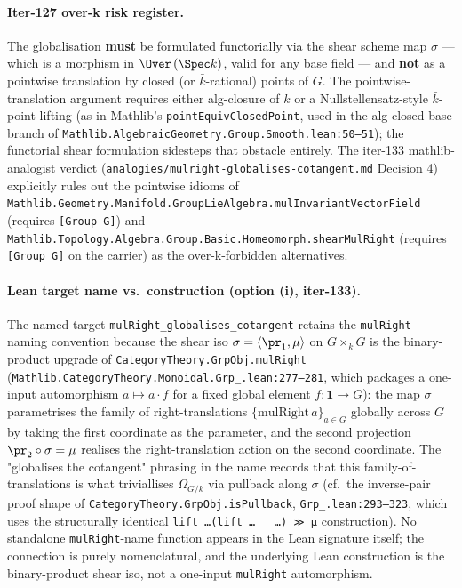 \begin{lemma}
  \paragraph{Iter-127 over-k risk register.} The globalisation \textbf{must} be formulated functorially via the shear scheme map \(\sigma\) — which is a morphism in \(\Over\,(\Spec k)\), valid for any base field — and \textbf{not} as a pointwise translation by closed (or \(\bar k\)-rational) points of \(G\). The pointwise-translation argument requires either alg-closure of \(k\) or a Nullstellensatz-style \(\bar k\)-point lifting (as in Mathlib's \texttt{pointEquivClosedPoint}, used in the alg-closed-base branch of \texttt{Mathlib.AlgebraicGeometry.Group.Smooth.lean:50--51}); the functorial shear formulation sidesteps that obstacle entirely. The iter-133 mathlib-analogist verdict (\texttt{analogies/mulright-globalises-cotangent.md} Decision 4) explicitly rules out the pointwise idioms of \texttt{Mathlib.Geometry.Manifold.GroupLieAlgebra.mulInvariantVectorField} (requires \texttt{[Group G]}) and \texttt{Mathlib.Topology.Algebra.Group.Basic.Homeomorph.shearMulRight} (requires \texttt{[Group G]} on the carrier) as the over-k-forbidden alternatives.

  \paragraph{Lean target name vs.\ construction (option (i), iter-133).} The named target \texttt{mulRight\_globalises\_cotangent} retains the \texttt{mulRight} naming convention because the shear iso \(\sigma = \langle \pr_{1}, \mu \rangle\) on \(G \times_{k} G\) is the binary-product upgrade of \texttt{CategoryTheory.GrpObj.mulRight} (\texttt{Mathlib.CategoryTheory.Monoidal.Grp\_.lean:277--281}, which packages a one-input automorphism \(a \mapsto a \cdot f\) for a fixed global element \(f \colon \mathbf{1} \to G\)): the map \(\sigma\) parametrises the family of right-translations \(\{\mathrm{mulRight}\,a\}_{a \in G}\) globally across \(G\) by taking the first coordinate as the parameter, and the second projection \(\pr_{2} \circ \sigma = \mu\) realises the right-translation action on the second coordinate. The "globalises the cotangent" phrasing in the name records that this family-of-translations is what triviallises \(\Omega_{G/k}\) via pullback along \(\sigma\) (cf.\ the inverse-pair proof shape of \texttt{CategoryTheory.GrpObj.isPullback}, \texttt{Grp\_.lean:293--323}, which uses the structurally identical \texttt{lift \dots (lift \dots \,\iota\, \dots) ≫ μ} construction). No standalone \texttt{mulRight}-name function appears in the Lean signature itself; the connection is purely nomenclatural, and the underlying Lean construction is the binary-product shear iso, not a one-input \texttt{mulRight} automorphism.
\end{lemma}

